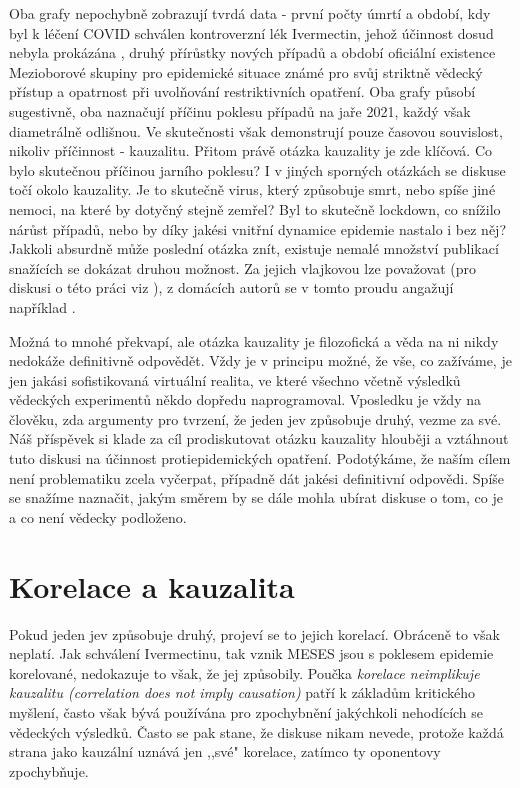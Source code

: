 Oba grafy nepochybně zobrazují tvrdá data - první počty úmrtí a období,
kdy byl k léčení COVID schválen kontroverzní
lék Ivermectin, jehož účinnost dosud nebyla  prokázána \cite{mzcriver},
druhý přírůstky nových případů a období oficiální existence Mezioborové
skupiny pro epidemické situace \cite{zalozenimeses} známé pro svůj
striktně vědecký přístup a opatrnost při uvolňování restriktivních
opatření. Oba grafy působí sugestivně, oba naznačují příčinu poklesu případů
na jaře 2021, každý však diametrálně odlišnou. Ve skutečnosti však demonstrují pouze časovou souvislost, nikoliv příčinnost - kauzalitu. Přitom právě otázka kauzality je zde klíčová. Co bylo skutečnou příčinou jarního poklesu? I v jiných sporných otázkách se diskuse točí okolo kauzality. Je to skutečně virus, který
způsobuje smrt, nebo spíše jiné nemoci, na které by dotyčný stejně zemřel? Byl to skutečně lockdown, co snížilo nárůst případů,
nebo by díky jakési vnitřní dynamice epidemie nastalo i bez něj? Jakkoli
absurdně může poslední otázka znít, existuje nemalé množství publikací
snažících se dokázat druhou možnost. Za jejich vlajkovou lze považovat \cite{bendavid2021assessing}
(pro diskusi o této práci viz \cite{kluveitIoan}), z domácích autorů
se v tomto proudu angažují například \cite{hradsky2021demographic}. 

Možná to mnohé překvapí, ale otázka kauzality je filozofická a věda na ni nikdy nedokáže definitivně odpovědět. Vždy je
v principu možné, že vše, co zažíváme, je jen jakási sofistikovaná
virtuální realita, ve které všechno včetně výsledků vědeckých experimentů
někdo dopředu naprogramoval. Vposledku je vždy na člověku, zda argumenty
pro tvrzení, že jeden jev způsobuje druhý, vezme za své. Náš příspěvek
si klade za cíl prodiskutovat otázku kauzality hlouběji a vztáhnout
tuto diskusi na účinnost
protiepidemických opatření. Podotýkáme, že naším cílem není problematiku
zcela vyčerpat, případně dát jakési definitivní odpovědi. Spíše se snažíme
naznačit, jakým směrem by se dále mohla ubírat diskuse o tom, co je
a co není vědecky podloženo.

\section*{Korelace a kauzalita}

Pokud jeden jev způsobuje druhý, projeví se to jejich korelací. Obráceně to však neplatí. Jak schválení Ivermectinu, tak vznik MESES jsou s poklesem epidemie korelované, nedokazuje to však, že jej způsobily. Poučka {\em korelace neimplikuje kauzalitu (correlation does not imply causation)} patří k základům kritického myšlení, často však bývá používána pro zpochybnění jakýchkoli nehodících se vědeckých výsledků. Často se pak stane, že diskuse nikam nevede, protože každá strana jako kauzální uznává jen ,,své" korelace, zatímco ty oponentovy zpochybňuje.

